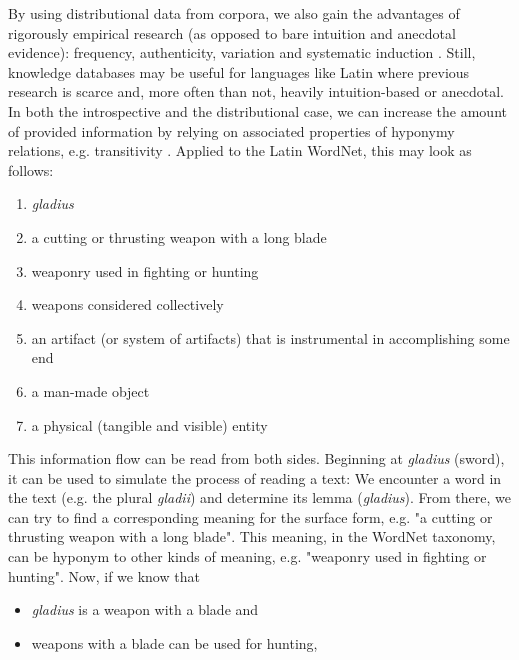 \documentclass[oneside]{book}
\begin{document}
By using distributional data from corpora, we also gain the advantages of rigorously empirical research (as opposed to bare intuition and anecdotal evidence): frequency, authenticity, variation and systematic induction \parencite[60]{griesBehavioralProfilesCorpusbased2009}. Still, knowledge databases may be useful for languages like Latin where previous research is scarce and, more often than not, heavily intuition-based or anecdotal. In both the introspective and the distributional case, we can increase the amount of provided information by relying on associated properties of hyponymy relations, e.g. transitivity \parencite[58]{coenenAnalogieUndMetapher2013}. Applied to the Latin WordNet, this may look as follows:
\begin{enumerate}
         \item \textit{gladius}
         \item a cutting or thrusting weapon with a long blade
         \item weaponry used in fighting or hunting
         \item weapons considered collectively
         \item an artifact (or system of artifacts) that is instrumental in accomplishing some end
         \item a man-made object
         \item a physical (tangible and visible) entity
\end{enumerate}
This information flow can be read from both sides. Beginning at \textit{gladius} (sword), it can be used to simulate the process of reading a text: We encounter a word in the text (e.g. the plural \textit{gladii}) and determine its lemma (\textit{gladius}). From there, we can try to find a corresponding meaning for the surface form, e.g. "a cutting or thrusting weapon with a long blade". This meaning, in the WordNet taxonomy, can be hyponym to other kinds of meaning, e.g. "weaponry used in fighting or hunting". Now, if we know that
\begin{itemize}
         \item \textit{gladius} is a weapon with a blade and
         \item weapons with a blade can be used for hunting,
\end{itemize}
\end{document}
